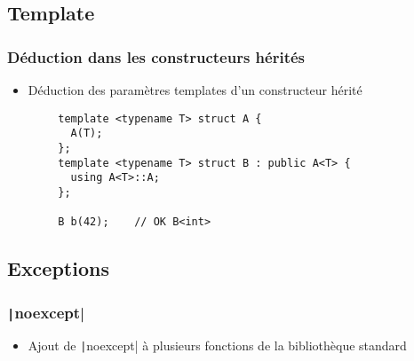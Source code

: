 \documentclass[C++.tex]{subfiles}
\begin{document}
\subsection*{Template}
\begin{frame}[fragile]
	\frametitle{Déduction dans les constructeurs hérités}
	\begin{itemize}
		\item Déduction des paramètres templates d'un constructeur hérité
	\end{itemize}

	\begin{verbatim}
		template <typename T> struct A {
		  A(T);
		};
		template <typename T> struct B : public A<T> {
		  using A<T>::A;
		};

		B b(42);	// OK B<int>
	\end{verbatim}
\end{frame}

\subsection*{Exceptions}
\begin{frame}[fragile]
	\frametitle{\texttt|noexcept|}
	\begin{itemize}
		\item Ajout de \texttt|noexcept| à plusieurs fonctions de la bibliothèque standard
	\end{itemize}
\end{frame}
\end{document}
